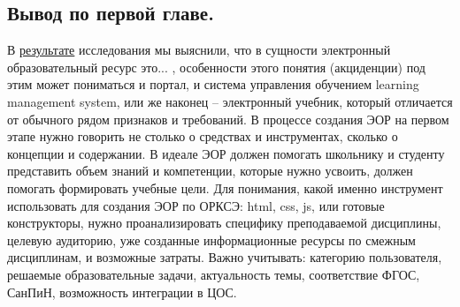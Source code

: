\newpage
\subsection{Вывод по первой главе.}
В \hyperref[task1]{результате} исследования мы выяснили, что в сущности электронный образовательный ресурс это... , особенности этого понятия (акциденции) под этим может пониматься и портал, и система управления обучением learning management system, или же наконец -- электронный учебник, который отличается от обычного рядом признаков и требований. 
В процессе создания ЭОР на первом этапе нужно говорить не столько о средствах и инструментах, сколько о концепции и содержании.
В идеале ЭОР должен помогать школьнику и студенту представить объем знаний и компетенции, которые нужно усвоить, должен помогать формировать учебные цели.
Для понимания, какой именно инструмент использовать для создания ЭОР по ОРКСЭ: html, css, js, или готовые конструкторы, нужно проанализировать специфику преподаваемой дисциплины, целевую аудиторию, уже созданные информационные ресурсы по смежным дисциплинам, и возможные затраты.
Важно учитывать: категорию пользователя, решаемые образовательные задачи, актуальность темы, соответствие ФГОС, СанПиН, возможность интеграции в ЦОС.
\listoftodos